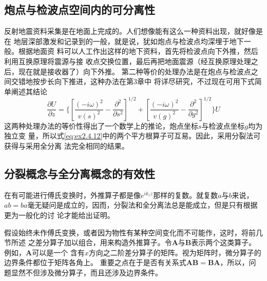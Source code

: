 \subsection{炮点与检波点空间内的可分离性}
\label{sec:2.4.7}

反射地震资料采集是在地面上完成的。人们想像能有这么一种资料出现，就好像是在
地层深部激发和记录到的一般，就是说，犹如炮点与检波点均深埋于地下一般。根据地面资
料可以人工作出这样的地下资料，首先将检波点向下外推，然后利用互换原理将震源与接
收点交换位置，最后再把地面震源（经互换原理处理之后，现在就是接收器了）向下外推。
第二种等价的处理办法是在炮点与检波点之间交错地按步长向下推进，这种办法在第3章中
将详尽研究，不过现在可用下式简单阐述其结论
\begin{equation}
\frac{\partial U}{\partial z}=\{
[\frac{(-i\omega)^2}{v(s)^2}-\frac{\partial^2}{\partial s^2}]^{1/2}+
[\frac{(-i\omega)^2}{v(g)^2}-\frac{\partial^2}{\partial g^2}]^{1/2}
\}U
\label{eq:ex2.4.12}
\end{equation}
这两种处理办法的等价性得出了一个数学上的推论，炮点坐标$s$与检波点坐标$g$均为独立变
量，所以式\ref{eq:ex2.4.12}中的两个平方根算子可互易。因此，采用分裂法可获得与采用全分离
法完全相同的结果。

\subsection{分裂概念与全分离概念的有效性}
\label{sec:2.4.8}
在有可能进行傅氏变换时，外推算子都是像$e^{ik_zz}$那样的复数。就复数$a$与$b$来说，$ab=ba$毫无疑问是成立的，因而，分裂法和全分离法总是能成立，但是只有根据更为一般化的讨
论才能给出证明。

假设始终未作傅氏变换，或者因为物性有某种空间变化而不可能作，这时，将前几节所述
之差分算子加以组合，用来构造外推算子。令$\mathbf{A}$与$\mathbf{B}$表示两个这类算子。例如，$\mathbf{A}$可以是一个
含有$x$方向之二阶差分算子的矩阵。视为矩阵时，微分算子的边界条件都位于矩阵各角上。
重要之点在于是否有关系式$\mathbf{AB}=\mathbf{BA}$，所以，问题显然不但涉及微分算子，而且还涉及边界条件。

